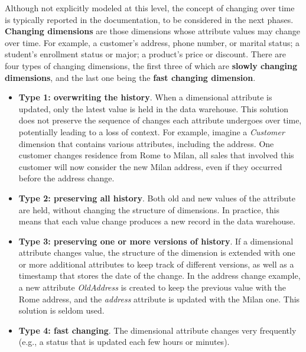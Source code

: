 Although not explicitly modeled at this level, the concept of changing over time is typically reported in the documentation, to be considered in the next phases. \textbf{Changing dimensions} are those dimensions whose attribute values may change over time. For example, a customer's address, phone number, or marital status; a student's enrollment status or major; a product's price or discount. There are four types of changing dimensions, the first three of which are \textbf{slowly changing dimensions}, and the last one being the \textbf{fast changing dimension}.
\begin{itemize}
    \item \textbf{Type 1: overwriting the history}. When a dimensional attribute is updated, only the latest value is held in the data warehouse. This solution does not preserve the sequence of changes each attribute undergoes over time, potentially leading to a loss of context. For example, imagine a \textit{Customer} dimension that contains various attributes, including the address. One customer changes residence from Rome to Milan, all sales that involved this customer will now consider the new Milan address, even if they occurred before the address change.
    \item \textbf{Type 2: preserving all history}. Both old and new values of the attribute are held, without changing the structure of dimensions. In practice, this means that each value change produces a new record in the data warehouse.
    \item \textbf{Type 3: preserving one or more versions of history}. If a dimensional attribute changes value, the structure of the dimension is extended with one or more additional attributes to keep track of different versions, as well as a timestamp that stores the date of the change. In the address change example, a new attribute \textit{OldAddress} is created to keep the previous value with the Rome address, and the \textit{address} attribute is updated with the Milan one. This solution is seldom used.
    \item \textbf{Type 4: fast changing}. The dimensional attribute changes very frequently (e.g., a status that is updated each few hours or minutes).
\end{itemize}

